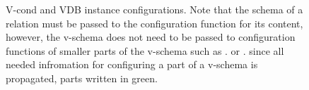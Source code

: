 \begin{figure}
\caption{
V-cond and VDB instance configurations.
Note that the schema of a relation must be passed to the configuration function
for its content,
however, the v-schema does not need to be passed to configuration 
functions of smaller parts of the v-schema such as \orSem .  or \olSem .
since all needed infromation for configuring a part of a v-schema
is propagated, \textcolor {green(munsell)}{parts written in green}.
}
\label{fig:vdb-conf}
\end{figure} 
